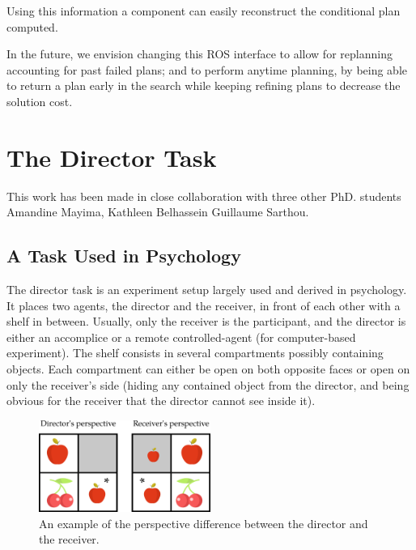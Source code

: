 \documentclass[a4paper,11pt,twoside]{StyleThese}
\begin{document}
Using this information a component can easily reconstruct the conditional plan computed.

In the future, we envision changing this ROS interface to allow for replanning accounting for past failed plans; and to perform anytime planning, by being able to return a plan early in the search while keeping refining plans to decrease the solution cost.

\section{The Director Task}
This work has been made in close collaboration with three other PhD. students Amandine Mayima, Kathleen Belhassein Guillaume Sarthou.

\subsection{A Task Used in Psychology}
The director task is an experiment setup largely used and derived in psychology. It places two agents, the director and the receiver, in front of each other with a shelf in between. Usually, only the receiver is the participant, and the director is either an accomplice or a remote controlled-agent (for computer-based experiment). The shelf consists in several compartments possibly containing objects. Each compartment can either be open on both opposite faces or open on only the receiver's side (hiding any contained object from the director, and being obvious for the receiver that the director cannot see inside it).

\begin{figure}[hbtp]
\centering
\includegraphics[width=0.5\textwidth]{figures/chapter5/dt_apple.png}
\caption{An example of the perspective difference between the director and the receiver.}
\label{fig:chap5dtapple}
\end{figure}
\end{document}
